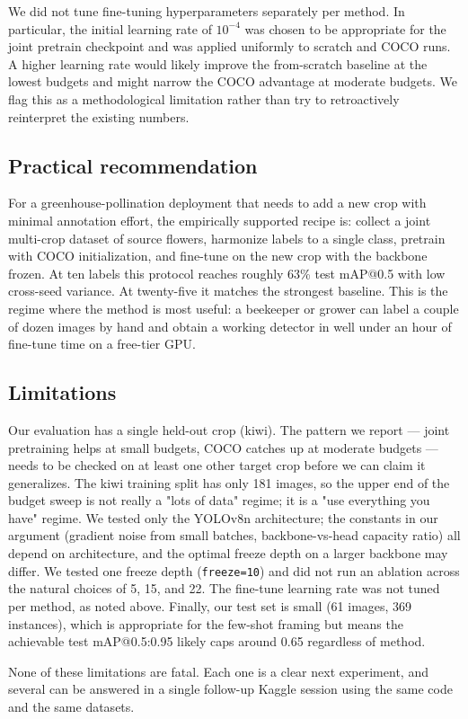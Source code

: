 We did not tune fine-tuning hyperparameters separately per method. In particular, the initial learning rate of $10^{-4}$ was chosen to be appropriate for the joint pretrain checkpoint and was applied uniformly to scratch and COCO runs. A higher learning rate would likely improve the from-scratch baseline at the lowest budgets and might narrow the COCO advantage at moderate budgets. We flag this as a methodological limitation rather than try to retroactively reinterpret the existing numbers.

\subsection{Practical recommendation}

For a greenhouse-pollination deployment that needs to add a new crop with minimal annotation effort, the empirically supported recipe is: collect a joint multi-crop dataset of source flowers, harmonize labels to a single class, pretrain with COCO initialization, and fine-tune on the new crop with the backbone frozen. At ten labels this protocol reaches roughly 63\% test mAP@0.5 with low cross-seed variance. At twenty-five it matches the strongest baseline. This is the regime where the method is most useful: a beekeeper or grower can label a couple of dozen images by hand and obtain a working detector in well under an hour of fine-tune time on a free-tier GPU.

\subsection{Limitations}

Our evaluation has a single held-out crop (kiwi). The pattern we report --- joint pretraining helps at small budgets, COCO catches up at moderate budgets --- needs to be checked on at least one other target crop before we can claim it generalizes. The kiwi training split has only 181 images, so the upper end of the budget sweep is not really a "lots of data" regime; it is a "use everything you have" regime. We tested only the YOLOv8n architecture; the constants in our argument (gradient noise from small batches, backbone-vs-head capacity ratio) all depend on architecture, and the optimal freeze depth on a larger backbone may differ. We tested one freeze depth (\texttt{freeze=10}) and did not run an ablation across the natural choices of 5, 15, and 22. The fine-tune learning rate was not tuned per method, as noted above. Finally, our test set is small (61 images, 369 instances), which is appropriate for the few-shot framing but means the achievable test mAP@0.5{:}0.95 likely caps around 0.65 regardless of method.

None of these limitations are fatal. Each one is a clear next experiment, and several can be answered in a single follow-up Kaggle session using the same code and the same datasets.
